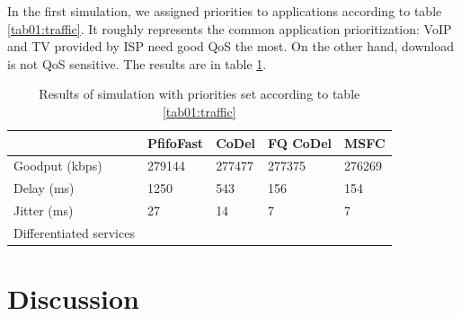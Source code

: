 In the first simulation, we assigned priorities to applications according to table \ref{tab01:traffic}. It roughly represents the common application prioritization: VoIP and TV provided by ISP need good QoS the most. On the other hand, download is not QoS sensitive. The results are in table \ref{tab02:results}.




\begin{table}[]
	\centering
	\caption{Results of simulation with priorities set according to table \ref{tab01:traffic}}
	\label{tab02:results}
	\begin{tabular}{lllll}
		\hline
		& PfifoFast & CoDel  & FQ CoDel & MSFC   \\ \hline
		Goodput (kbps)          & 279144    & 277477 & 277375   & 276269 \\
		Delay (ms)              & 1250      & 543    & 156      & 154    \\
		Jitter (ms)             & 27        & 14     & 7        & 7      \\
		Differentiated services &           &        &          &        \\ \hline
	\end{tabular}
\end{table}







\section{Discussion}